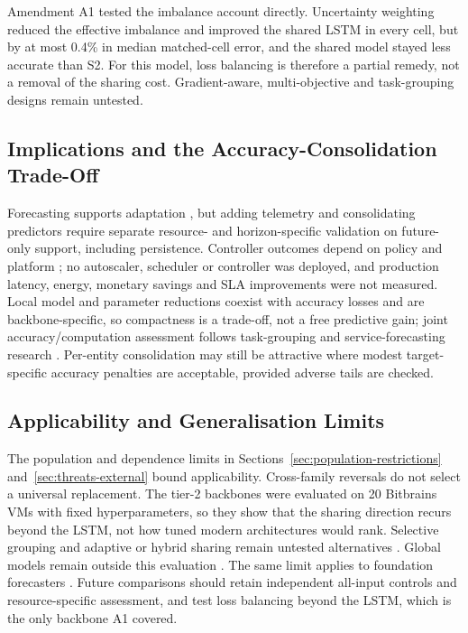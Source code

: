 \documentclass[5p,twocolumn]{elsarticle}
\begin{document}
Amendment A1 tested the imbalance account directly. Uncertainty weighting
reduced the effective imbalance and improved the shared LSTM in every cell,
but by at most 0.4\% in median matched-cell error, and the shared model
stayed less accurate than S2. For this model, loss balancing is therefore a
partial remedy, not a removal of the sharing cost. Gradient-aware,
multi-objective and task-grouping designs
\citep{Sener2018MultiObjective,Yu2020GradientSurgery,Fifty2021TaskGroupings}
remain untested.

\subsection{Implications and the Accuracy-Consolidation Trade-Off}
\label{sec:discussion-systems}
\label{sec:discussion-efficiency}

Forecasting supports adaptation
\citep{Taherizadeh2018Monitoring,Bauer2020SelfAware}, but adding telemetry and
consolidating predictors require separate resource- and horizon-specific
validation on future-only support, including persistence. Controller outcomes
depend on policy and platform \citep{Qu2018Autoscaling}; no autoscaler,
scheduler or controller was deployed, and production latency, energy,
monetary savings and SLA improvements were not measured. Local model and
parameter reductions coexist with accuracy losses and are backbone-specific,
so compactness is a trade-off, not a free predictive gain; joint
accuracy/computation assessment follows task-grouping and service-forecasting
research \citep{Standley2020TaskGrouping,Syu2017DynamicQoS}. Per-entity
consolidation may still be attractive where modest target-specific accuracy
penalties are acceptable, provided adverse tails are checked.

\subsection{Applicability and Generalisation Limits}
\label{sec:discussion-applicability}

The population and dependence limits in Sections~\ref{sec:population-restrictions}
and~\ref{sec:threats-external} bound applicability. Cross-family reversals do not
select a universal replacement. The tier-2 backbones were evaluated on 20
Bitbrains VMs with fixed hyperparameters, so they show that the sharing
direction recurs beyond the LSTM, not how tuned modern architectures would
rank. Selective grouping and adaptive or hybrid sharing remain untested
alternatives
\citep{Fifty2021TaskGroupings,Yu2020GradientSurgery,Nochumsohn2025MTLinear}.
Global models remain outside this evaluation
\citep{MonteroManso2021GlobalForecasting}.
The same limit applies to foundation forecasters
\citep{DiMenna2026RuntimeForecasting}. Future comparisons should retain
independent all-input controls and resource-specific assessment, and test
loss balancing beyond the LSTM, which is the only backbone A1 covered.
\end{document}
